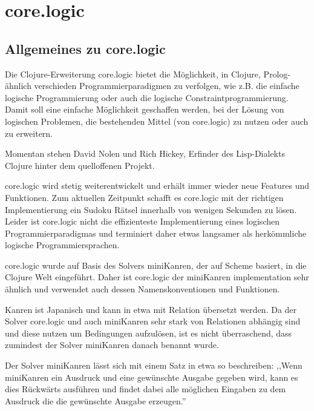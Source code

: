 \section{core.logic} 

\subsection{Allgemeines zu core.logic}

Die Clojure-Erweiterung core.logic bietet die Möglichkeit, in Clojure, Prolog-ähnlich verschieden Programmierparadigmen zu verfolgen, wie z.B. die einfache logische Programmierung oder auch die logische Constraintprogrammierung. Damit soll eine einfache Möglichkeit geschaffen werden, bei der Lösung von logischen Problemen, die bestehenden Mittel (von core.logic) zu nutzen oder auch zu erweitern.

Momentan stehen David Nolen und Rich Hickey, Erfinder des Lisp-Dialekts Clojure hinter dem quelloffenen Projekt.

core.logic wird stetig weiterentwickelt und erhält immer wieder neue Features und Funktionen. Zum aktuellen Zeitpunkt schafft es core.logic mit der richtigen Implementierung ein Sudoku Rätsel innerhalb von wenigen Sekunden zu lösen. Leider ist core.logic nicht die effizienteste Implementierung eines logischen Programmierparadigmas und terminiert daher etwas langsamer als herkömmliche logische Programmiersprachen.

core.logic wurde auf Basis des Solvers miniKanren, der auf Scheme basiert, in die Clojure Welt eingeführt. Daher ist core.logic der miniKanren implementation sehr ähnlich und verwendet auch dessen Namenskonventionen und Funktionen.

Kanren ist Japanisch und kann in etwa mit Relation übersetzt werden. Da der Solver core.logic und auch miniKanren sehr stark von Relationen abhängig sind und diese nutzen um Bedingungen aufzulösen, ist es nicht überraschend, dass zumindest der Solver miniKanren danach benannt wurde.

Der Solver miniKanren lässt sich mit einem Satz in etwa so beschreiben:
,,Wenn miniKanren ein Ausdruck und eine gewünschte Ausgabe gegeben wird, kann es dies Rückwärts ausführen und findet dabei alle möglichen Eingaben zu dem Ausdruck die die gewünschte Ausgabe erzeugen.''
